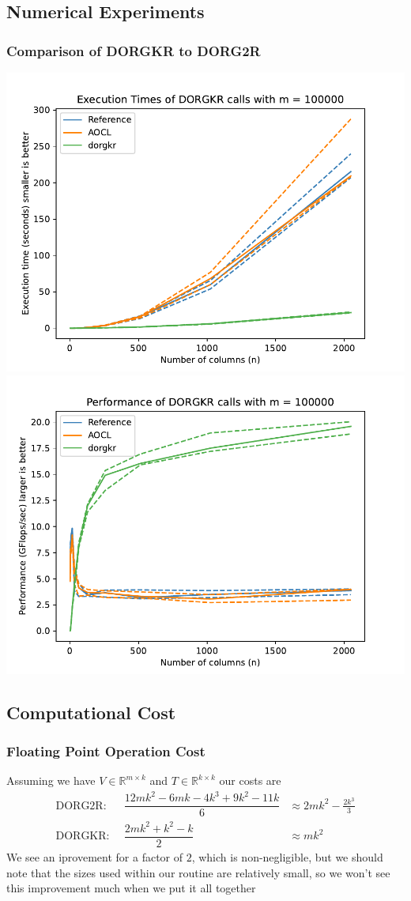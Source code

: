 \documentclass[12pt,aspectratio=169]{beamer}
\newcommand{\R}{\mathbb{R}}
\begin{document}
    \subsection{Numerical Experiments}
    \begin{frame}
        \frametitle{Comparison of DORGKR to DORG2R}
        \begin{center}
        \includegraphics[width=.45\textwidth]{figures/timeDORGKR.pdf}
        \includegraphics[width=.45\textwidth]{figures/flopDORGKR.pdf}
        \end{center}
    \end{frame}
    \subsection{Computational Cost}
    \begin{frame}
        \frametitle{Floating Point Operation Cost}
        Assuming we have $V\in\R^{m\times k}$ and $T\in\R^{k\times k}$ our costs are 
        $$
        \begin{aligned}
            \text{DORG2R: }&\, \dfrac{12mk^2 - 6mk -4k^3 +9k^2 - 11k}{6} &\approx 2mk^2 - \frac{2k^3}{3}\\
            \text{DORGKR: }&\, \dfrac{2mk^2 + k^2 - k}{2} &\approx mk^2
        \end{aligned}
        $$
        We see an iprovement for a factor of $2$, which is non-negligible, but we should note that the sizes
        used within our routine are relatively small, so we won't see this improvement much when we put it all together

        
    \end{frame}
\end{document}
